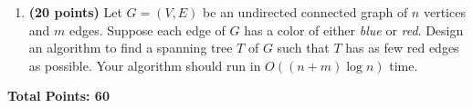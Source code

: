 \documentclass[11pt]{article}
\begin{document}
\begin{enumerate}
\begin{enumerate}
\end{enumerate}

{\bf Note:} For each of the two questions, your answer should be either ``Yes'' or ``Not necessary''. Again, please explain why you obtain your answers.

\item
{\bf (20 points)}
Let $G=(V,E)$ be an undirected connected graph of $n$ vertices and $m$ edges. Suppose each edge of $G$ has a color of either {\em blue} or {\em red}. Design an algorithm to
find a spanning tree $T$ of $G$ such that $T$ has as few red edges as possible. Your algorithm should run in $O((n+m)\log n)$ time. 



\end{enumerate}


{\bf Total Points: 60}
\end{document}
